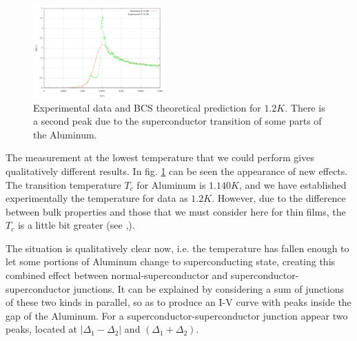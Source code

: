 \begin{figure}[h!]
\centering
\includegraphics[width=0.45\textwidth]{gv_theo_exp_10}
\caption{\small Experimental data and BCS theoretical prediction for $1.2 K$. There is a second peak due to the superconductor transition of some parts of the Aluminum.
\label{gv_theo_exp_10}}
\end{figure}

The measurement at the lowest temperature that we could perform gives qualitatively different results. In fig. \ref{gv_theo_exp_10} can be seen the appearance of new effects. The transition temperature $T_c$ for Aluminum is $1.140 K$, and we have established experimentally the temperature for data as $1.2 K$. However, due to the difference between bulk properties and those that we must consider here for thin films, the $T_c$ is a little bit greater (see \cite{films},).

The situation is qualitatively clear now, i.e. the temperature has fallen enough to let some portions of Aluminum change to superconducting state, creating this combined effect between normal-superconductor and superconductor-superconductor junctions. It can be explained by considering a sum of junctions of these two kinds in parallel, so as to produce an I-V curve with peaks inside the gap of the Aluminum. For a superconductor-superconductor junction appear two peaks, located at $| \Delta_1-\Delta_2|$ and $(\Delta_1+\Delta_2)$.


